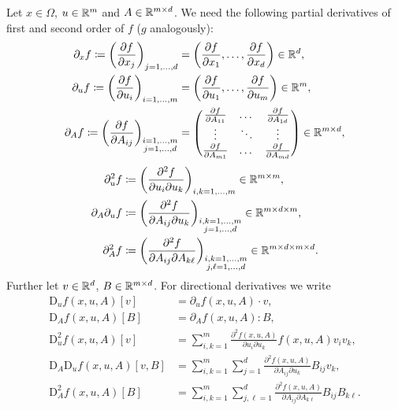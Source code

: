 \documentclass[12pt,a4paper]{article}
\begin{document}
Let $x\in\Omega$, $u\in{\mathbb R}^m$ and $A\in{\mathbb R}^{m\times d}$.
We need the following partial derivatives of first and second order of $f$ ($g$ analogously):
\[
\begin{aligned}
    \partial_x f 
    \coloneqq \left(\frac{\partial f}{\partial x_j}\right)_{j=1,\dots,d} 
    &=\left(\frac{\partial f}{\partial x_1},\dots, \frac{\partial f}{\partial x_d}\right) 
    \in{\mathbb R}^d,
    \\
    \partial_u f 
    \coloneqq \left(\frac{\partial f}{\partial u_i}\right)_{i=1,\dots,m}
    &=\left(\frac{\partial f}{\partial u_1},\dots, \frac{\partial f}{\partial u_m}\right) 
    \in{\mathbb R}^m,
    \\
    \partial_A f 
    \coloneqq \left(\frac{\partial f}{\partial A_{ij}}\right)_{\substack{i=1,\dots,m\\j=1,\dots,d}}
    &=\begin{pmatrix}
        \frac{\partial f}{\partial A_{11}} & \dots &  \frac{\partial f}{\partial A_{1d}} \\
        \vdots & \ddots & \vdots\\
        \frac{\partial f}{\partial A_{m1}}
        & \dots &  \frac{\partial f}{\partial A_{md}}
    \end{pmatrix}
    \in{\mathbb R}^{m\times d},
\end{aligned}
\]
\[
\begin{aligned}
    \partial_u^2 f 
    &\coloneqq \left(\frac{\partial^2 f}{\partial u_i\partial u_k}\right)_{\substack{i,k=1,\dots,m}}
    \in{\mathbb R}^{m\times m},
    \\
    \partial_A\partial_u f 
    &\coloneqq 
    \left(\frac{\partial^2 f}{\partial A_{ij}\partial u_k}\right)_{\substack{i,k=1,\dots,m\\j=1,\dots,d}}
    \in{\mathbb R}^{m\times d\times m},
    \\
    \partial_A^2 f 
    &\coloneqq 
    \left(\frac{\partial^2 f}{\partial A_{ij}\partial A_{k\ell}}\right)_{\substack{i,k=1,\dots,m\\j,\ell=1,\dots,d}}
    \in{\mathbb R}^{m\times d\times m\times d}.
\end{aligned}
\]
Further let $v\in{\mathbb R}^d$, $B\in{\mathbb R}^{m\times d}$.
For directional derivatives we write
\[
\begin{aligned}
    \mathrm{D}_u f(x,u,A)[v]
    &=\partial_u f(x,u,A)\cdot v,
    \\
    \mathrm{D}_A f(x,u,A)[B]
    &=\partial_A f(x,u,A):B,
    \\
    \mathrm{D}_u^2 f(x,u,A)[v]
    &=\sum_{i,k=1}^m
    \frac{\partial^2 f(x,u,A)}{\partial u_i\partial u_k} f(x,u,A)v_i v_k,
    \\
    \mathrm{D}_A\mathrm{D}_u f(x,u,A)[v,B]
    &=\sum_{i,k=1}^m\sum_{j=1}^d\frac{\partial^2 f(x,u,A)}{\partial A_{ij}\partial u_k} B_{ij}v_k,
    \\
    \mathrm{D}_A^2 f(x,u,A)[B]
    &=\sum_{i,k=1}^m\sum_{j,\ell=1}^d\frac{\partial^2 f(x,u,A)}{\partial A_{ij}\partial A_{k\ell}}B_{ij}B_{k\ell}.
\end{aligned}
\]
\end{document}
